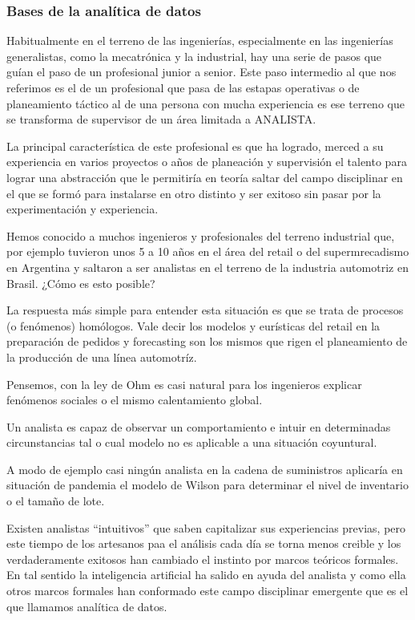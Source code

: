 \documentclass[]{article}
\begin{document}
\subsubsection{Bases de la analítica de
datos}\label{bases-de-la-analuxedtica-de-datos}

Habitualmente en el terreno de las ingenierías, especialmente en las
ingenierías generalistas, como la mecatrónica y la industrial, hay una
serie de pasos que guían el paso de un profesional junior a senior. Este
paso intermedio al que nos referimos es el de un profesional que pasa de
las estapas operativas o de planeamiento táctico al de una persona con
mucha experiencia es ese terreno que se transforma de supervisor de un
área limitada a ANALISTA.

La principal característica de este profesional es que ha logrado,
merced a su experiencia en varios proyectos o años de planeación y
supervisión el talento para lograr una abstracción que le permitiría en
teoría saltar del campo disciplinar en el que se formó para instalarse
en otro distinto y ser exitoso sin pasar por la experimentación y
experiencia.

Hemos conocido a muchos ingenieros y profesionales del terreno
industrial que, por ejemplo tuvieron unos 5 a 10 años en el área del
retail o del supermrecadismo en Argentina y saltaron a ser analistas en
el terreno de la industria automotriz en Brasil. ¿Cómo es esto posible?

La respuesta más simple para entender esta situación es que se trata de
procesos (o fenómenos) homólogos. Vale decir los modelos y eurísticas
del retail en la preparación de pedidos y forecasting son los mismos que
rigen el planeamiento de la producción de una línea automotríz.

Pensemos, con la ley de Ohm es casi natural para los ingenieros explicar
fenómenos sociales o el mismo calentamiento global.

Un analista es capaz de observar un comportamiento e intuir en
determinadas circunstancias tal o cual modelo no es aplicable a una
situación coyuntural.

A modo de ejemplo casi ningún analista en la cadena de suministros
aplicaría en situación de pandemia el modelo de Wilson para determinar
el nivel de inventario o el tamaño de lote.

Existen analistas ``intuitivos'' que saben capitalizar sus experiencias
previas, pero este tiempo de los artesanos paa el análisis cada día se
torna menos creible y los verdaderamente exitosos han cambiado el
instinto por marcos teóricos formales. En tal sentido la inteligencia
artificial ha salido en ayuda del analista y como ella otros marcos
formales han conformado este campo disciplinar emergente que es el que
llamamos analítica de datos.
\end{document}
